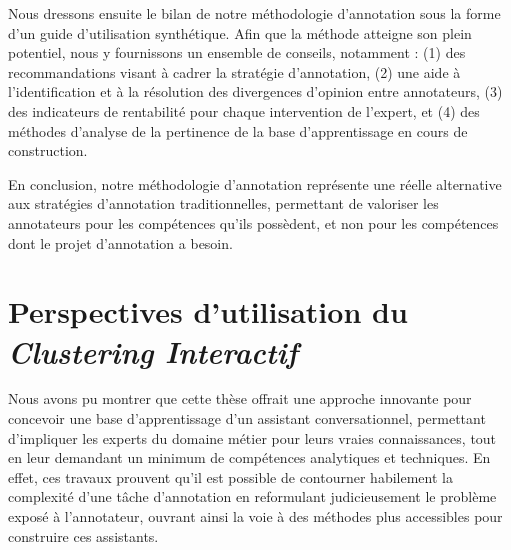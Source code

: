 		Nous dressons ensuite le bilan de notre méthodologie d'annotation sous la forme d'un guide d'utilisation synthétique.
		Afin que la méthode atteigne son plein potentiel, nous y fournissons un ensemble de conseils, notamment : (1) des recommandations visant à cadrer la stratégie d'annotation, (2) une aide à l'identification et à la résolution des divergences d'opinion entre annotateurs, (3) des indicateurs de rentabilité pour chaque intervention de l'expert, et (4) des méthodes d'analyse de la pertinence de la base d'apprentissage en cours de construction.
		
		En conclusion, notre méthodologie d'annotation représente une réelle alternative aux stratégies d'annotation traditionnelles, permettant de valoriser les annotateurs pour les compétences qu'ils possèdent, et non pour les compétences dont le projet d'annotation a besoin.
		
		
	\section*{Perspectives d'utilisation du \textit{Clustering Interactif}}
		
		Nous avons pu montrer que cette thèse offrait une approche innovante pour concevoir une base d'apprentissage d'un assistant conversationnel, permettant d'impliquer les experts du domaine métier pour leurs vraies connaissances, tout en leur demandant un minimum de compétences analytiques et techniques.
		En effet, ces travaux prouvent qu'il est possible de contourner habilement la complexité d'une tâche d'annotation en reformulant judicieusement le problème exposé à l'annotateur, ouvrant ainsi la voie à des méthodes plus accessibles pour construire ces assistants.

